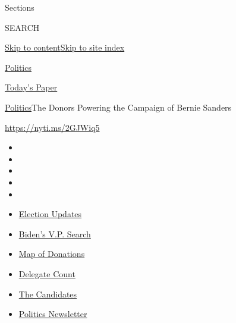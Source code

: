 Sections

SEARCH

\protect\hyperlink{site-content}{Skip to
content}\protect\hyperlink{site-index}{Skip to site index}

\href{https://www.nytimes.com/section/politics}{Politics}

\href{https://myaccount.nytimes.com/auth/login?response_type=cookie\&client_id=vi}{}

\href{https://www.nytimes.com/section/todayspaper}{Today's Paper}

\href{/section/politics}{Politics}\textbar{}The Donors Powering the
Campaign of Bernie Sanders

\url{https://nyti.ms/2GJWiq5}

\begin{itemize}
\item
\item
\item
\item
\item
\end{itemize}

\begin{itemize}
\item
  \href{https://www.nytimes.com/2020/07/31/us/elections/biden-vs-trump.html?action=click\&pgtype=Article\&state=default\&region=TOP_BANNER\&context=storylines_menu}{Election
  Updates}
\item
  \href{https://www.nytimes.com/article/biden-vice-president-2020.html?action=click\&pgtype=Article\&state=default\&region=TOP_BANNER\&context=storylines_menu}{Biden's
  V.P. Search}
\item
  \href{https://www.nytimes.com/interactive/2020/07/24/us/politics/trump-biden-campaign-donors.html?action=click\&pgtype=Article\&state=default\&region=TOP_BANNER\&context=storylines_menu}{Map
  of Donations}
\item
  \href{https://www.nytimes.com/interactive/2020/us/elections/delegate-count-primary-results.html?action=click\&pgtype=Article\&state=default\&region=TOP_BANNER\&context=storylines_menu}{Delegate
  Count}
\item
  \href{https://www.nytimes.com/interactive/2019/us/politics/2020-presidential-candidates.html?action=click\&pgtype=Article\&state=default\&region=TOP_BANNER\&context=storylines_menu}{The
  Candidates}
\item
  \href{https://www.nytimes.com/newsletters/politics?action=click\&pgtype=Article\&state=default\&region=TOP_BANNER\&context=storylines_menu}{Politics
  Newsletter}
\end{itemize}

